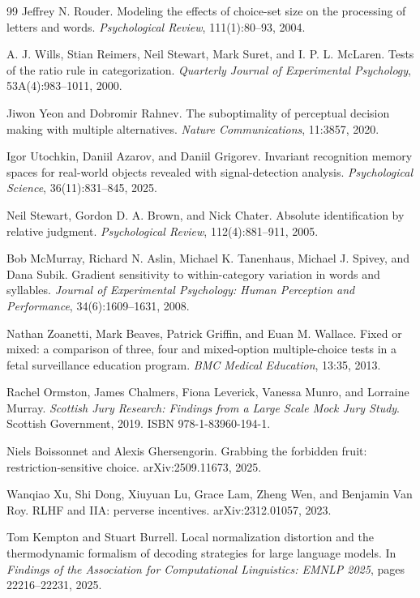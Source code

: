 \documentclass[11pt]{article}
\theoremstyle{italichead}
\begin{document}
\begin{thebibliography}{99}
Jeffrey N. Rouder.
Modeling the effects of choice-set size on the processing of letters and words.
\emph{Psychological Review}, 111(1):80--93, 2004.

A. J. Wills, Stian Reimers, Neil Stewart, Mark Suret, and I. P. L. McLaren.
Tests of the ratio rule in categorization.
\emph{Quarterly Journal of Experimental Psychology}, 53A(4):983--1011, 2000.

Jiwon Yeon and Dobromir Rahnev.
The suboptimality of perceptual decision making with multiple alternatives.
\emph{Nature Communications}, 11:3857, 2020.

Igor Utochkin, Daniil Azarov, and Daniil Grigorev.
Invariant recognition memory spaces for real-world objects revealed with signal-detection
analysis.
\emph{Psychological Science}, 36(11):831--845, 2025.

Neil Stewart, Gordon D. A. Brown, and Nick Chater.
Absolute identification by relative judgment.
\emph{Psychological Review}, 112(4):881--911, 2005.

Bob McMurray, Richard N. Aslin, Michael K. Tanenhaus, Michael J. Spivey, and Dana Subik.
Gradient sensitivity to within-category variation in words and syllables.
\emph{Journal of Experimental Psychology: Human Perception and Performance},
34(6):1609--1631, 2008.

Nathan Zoanetti, Mark Beaves, Patrick Griffin, and Euan M. Wallace.
Fixed or mixed: a comparison of three, four and mixed-option multiple-choice tests in a
fetal surveillance education program.
\emph{BMC Medical Education}, 13:35, 2013.

Rachel Ormston, James Chalmers, Fiona Leverick, Vanessa Munro, and Lorraine Murray.
\emph{Scottish Jury Research: Findings from a Large Scale Mock Jury Study}.
Scottish Government, 2019. ISBN 978-1-83960-194-1.

Niels Boissonnet and Alexis Ghersengorin.
Grabbing the forbidden fruit: restriction-sensitive choice.
arXiv:2509.11673, 2025.

Wanqiao Xu, Shi Dong, Xiuyuan Lu, Grace Lam, Zheng Wen, and Benjamin Van Roy.
RLHF and IIA: perverse incentives.
arXiv:2312.01057, 2023.

Tom Kempton and Stuart Burrell.
Local normalization distortion and the thermodynamic formalism of decoding strategies for
large language models.
In \emph{Findings of the Association for Computational Linguistics: EMNLP 2025}, pages
22216--22231, 2025.


\end{thebibliography}
\end{document}
